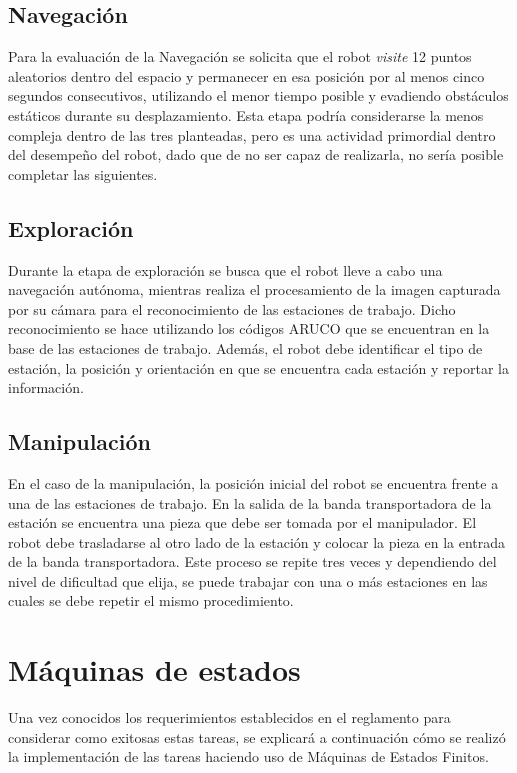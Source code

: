 \subsection{Navegación}
Para la evaluación de la Navegación se solicita que el robot \textit{visite} 12 puntos aleatorios dentro del espacio y permanecer en esa posición por al menos cinco segundos consecutivos, utilizando el menor tiempo posible y evadiendo obstáculos estáticos durante su desplazamiento.
Esta etapa podría considerarse la menos compleja dentro de las tres planteadas, pero es una actividad primordial dentro del desempeño del robot, dado que de no ser capaz de realizarla, no sería posible completar las siguientes.

\subsection{Exploración}
Durante la etapa de exploración se busca que el robot lleve a cabo una navegación autónoma, mientras realiza el procesamiento de la imagen capturada por su cámara para el reconocimiento de las estaciones de trabajo. Dicho reconocimiento se hace utilizando los códigos ARUCO que se encuentran en la base de las estaciones de trabajo. Además, el robot debe identificar el tipo de estación, la posición y orientación en que se encuentra cada estación y reportar la información.

\subsection{Manipulación}
En el caso de la manipulación, la posición inicial del robot se encuentra frente a una de las estaciones de trabajo. En la salida de la banda transportadora de la estación se encuentra una pieza que debe ser tomada por el manipulador. El robot debe trasladarse al otro lado de la estación y colocar la pieza en la entrada de la banda transportadora. Este proceso se repite tres veces y dependiendo del nivel de dificultad que elija, se puede trabajar con una o más estaciones en las cuales se debe repetir el mismo procedimiento. 

\section{Máquinas de estados}
Una vez conocidos los requerimientos establecidos en el reglamento para considerar como exitosas estas tareas, se explicará a continuación cómo se realizó la implementación de las tareas haciendo uso de Máquinas de Estados Finitos.

